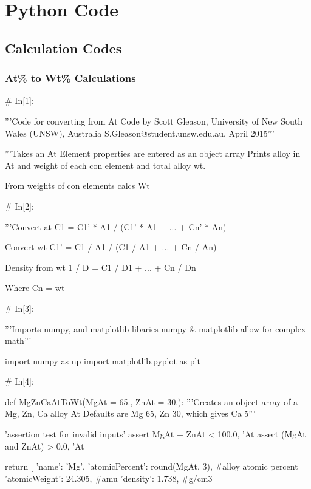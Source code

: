 \documentclass[a4paper,8pt]{article}
\begin{document}
\section{Python Code}
\subsection{Calculation Codes}
\subsubsection{At\% to Wt\% Calculations}

\begin{python}
# In[1]:

'''Code for converting from At%
Code by Scott Gleason, University of New South Wales (UNSW), Australia 
S.Gleason@student.unsw.edu.au, April 2015'''

'''Takes an At%
Element properties are entered as an object array
Prints alloy in At%
and weight of each con element and total alloy wt.

From weights of con elements calcs Wt%


# In[2]:

'''Convert at%
C1 = C1' * A1 / (C1' * A1 + ... + Cn' * An)

Convert wt%
C1' = C1 / A1 / (C1 / A1 + ... + Cn / An)

Density from wt%
1 / D = C1 / D1 + ... + Cn / Dn

Where Cn = wt%


# In[3]:

'''Imports numpy, and matplotlib libaries 
numpy & matplotlib allow for complex math'''

import numpy as np
import matplotlib.pyplot as plt


# In[4]:

def MgZnCaAtToWt(MgAt = 65., ZnAt = 30.):
'''Creates an object array of a Mg, Zn, Ca alloy
At%
Defaults are Mg 65, Zn 30, which gives Ca 5'''

'assertion test for invalid inputs'
assert MgAt + ZnAt < 100.0, 'At%
assert (MgAt and ZnAt) > 0.0, 'At%

return [
{'name': 'Mg', 
	'atomicPercent': round(MgAt, 3), #alloy atomic percent
	'atomicWeight': 24.305, #amu
	'density': 1.738}, #g/cm3


\end{python}
\end{document}
